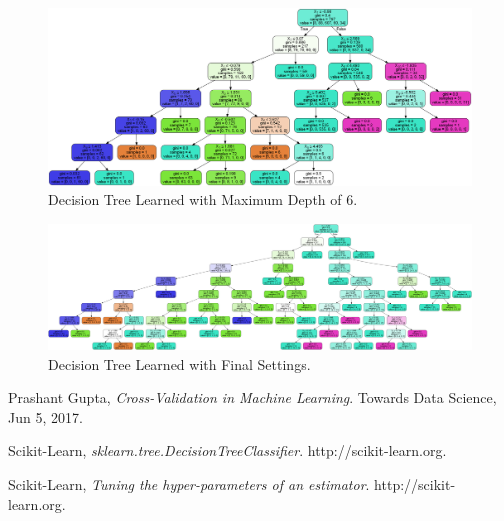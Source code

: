 \documentclass[12pt]{article}
\numberwithin{equation}{section}
\numberwithin{table}{section}
\numberwithin{figure}{section}
\begin{document}
\begin{figure}
	\includegraphics[width=\textwidth]{dt_max_depth_6.png}
	\caption{Decision Tree Learned with Maximum Depth of 6.}
	\label{fig:max_width}
\end{figure}

\begin{figure}
	\includegraphics[width=\textwidth]{dt_extra_1.png}
	\caption{Decision Tree Learned with Final Settings.}
	\label{fig:max_width}
\end{figure}

\begin{thebibliography}{999}
	
	Prashant Gupta,
	\emph{Cross-Validation in Machine Learning}.
	Towards Data Science,
	Jun 5, 2017.
	
	Scikit-Learn,
	\emph{sklearn.tree.DecisionTreeClassifier}.
	http://scikit-learn.org.
	
	Scikit-Learn,
	\emph{Tuning the hyper-parameters of an estimator}.
	http://scikit-learn.org.
	
\end{thebibliography}
\end{document}
